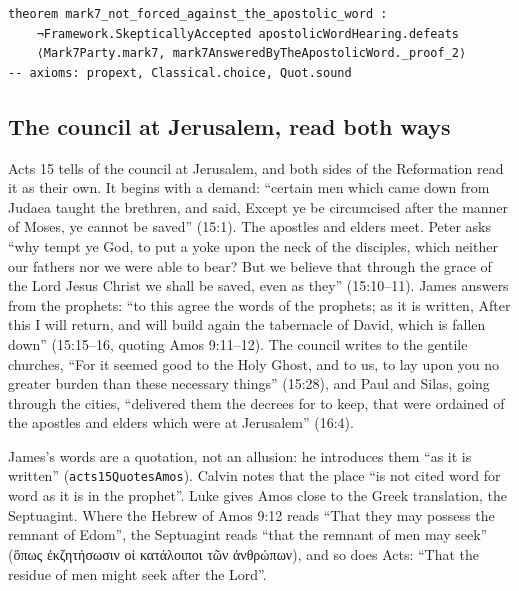 \documentclass[11pt]{article}
\begin{document}
{\small\begin{verbatim}
theorem mark7_not_forced_against_the_apostolic_word :
    ¬Framework.SkepticallyAccepted apostolicWordHearing.defeats
    ⟨Mark7Party.mark7, mark7AnsweredByTheApostolicWord._proof_2⟩
-- axioms: propext, Classical.choice, Quot.sound
\end{verbatim}}
\subsection*{The council at Jerusalem, read both ways}
Acts 15 tells of the council at Jerusalem, and both sides of the Reformation read it as their own. It begins with a demand: “certain men which came down from Judaea taught the brethren, and said, Except ye be circumcised after the manner of Moses, ye cannot be saved” (15:1). The apostles and elders meet. Peter asks “why tempt ye God, to put a yoke upon the neck of the disciples, which neither our fathers nor we were able to bear? But we believe that through the grace of the Lord Jesus Christ we shall be saved, even as they” (15:10–11). James answers from the prophets: “to this agree the words of the prophets; as it is written, After this I will return, and will build again the tabernacle of David, which is fallen down” (15:15–16, quoting Amos 9:11–12). The council writes to the gentile churches, “For it seemed good to the Holy Ghost, and to us, to lay upon you no greater burden than these necessary things” (15:28), and Paul and Silas, going through the cities, “delivered them the decrees for to keep, that were ordained of the apostles and elders which were at Jerusalem” (16:4).

James’s words are a quotation, not an allusion: he introduces them “as it is written” (\texttt{acts15\allowbreak{}Quotes\allowbreak{}Amos}). Calvin notes that the place “is not cited word for word as it is in the prophet”. Luke gives Amos close to the Greek translation, the Septuagint. Where the Hebrew of Amos 9:12 reads “That they may possess the remnant of Edom”, the Septuagint reads “that the remnant of men may seek” (ὅπως ἐκζητήσωσιν οἱ κατάλοιποι τῶν ἀνθρώπων), and so does Acts: “That the residue of men might seek after the Lord”.
\end{document}
